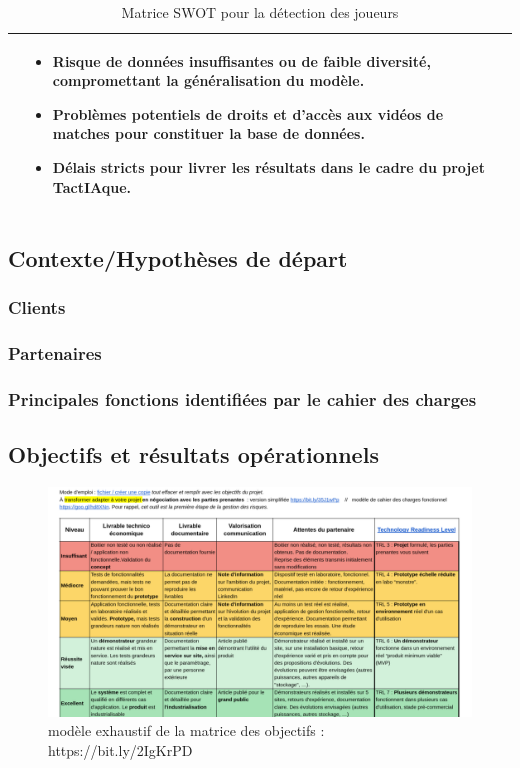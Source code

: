 \begin{table} [!h]
\begin{tabular}{|p{7cm}|p{7cm}|}
\begin{itemize}
        \end{itemize}&
        \begin{itemize}
            \item Risque de données insuffisantes ou de faible diversité, compromettant la généralisation du modèle. 
            \item Problèmes potentiels de droits et d’accès aux vidéos de matches pour constituer la base de données. 
            \item Délais stricts pour livrer les résultats dans le cadre du projet TactIAque. 
        \end{itemize}\\
        \hline  
        \end{tabular}  
        \caption{Matrice SWOT pour la détection des joueurs}  
        \label{tab:swot}
    \end{table} 
\clearpage
\subsection{Contexte/Hypothèses de départ}
\subsubsection{Clients}
\subsubsection{Partenaires}
\subsubsection{Principales fonctions identifiées par le cahier des charges}
\subsection{Objectifs et résultats opérationnels}
\begin{figure}[!h]
	\begin{center}
		\includegraphics[scale=0.4]{images/modele_plus_exhaustif_matrice_objectifs.png}
		\caption{modèle exhaustif de la matrice des objectifs : https://bit.ly/2IgKrPD}
	\end{center}
\end{figure}
\clearpage
